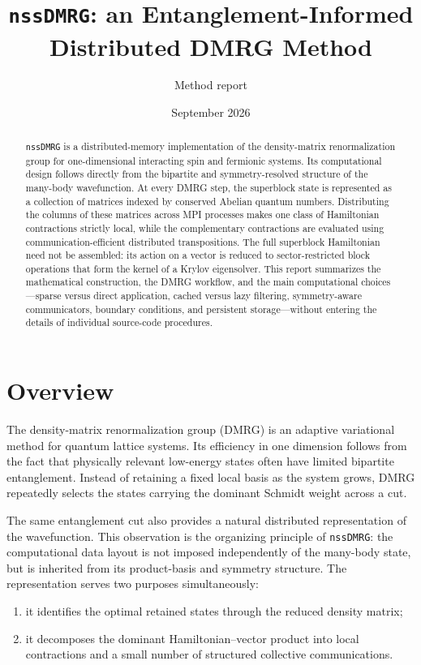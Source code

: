 \documentclass[11pt,a4paper]{article}
\title{\texttt{nssDMRG}: an Entanglement-Informed\\
Distributed DMRG Method}
\author{Method report}
\date{September 2026}
\begin{document}
\maketitle

\begin{abstract}
\texttt{nssDMRG} is a distributed-memory implementation of the density-matrix
renormalization group for one-dimensional interacting spin and fermionic
systems.  Its computational design follows directly from the bipartite and
symmetry-resolved structure of the many-body wavefunction.  At every DMRG
step, the superblock state is represented as a collection of matrices indexed
by conserved Abelian quantum numbers.  Distributing the columns of these
matrices across MPI processes makes one class of Hamiltonian contractions
strictly local, while the complementary contractions are evaluated using
communication-efficient distributed transpositions.  The full superblock
Hamiltonian need not be assembled: its action on a vector is reduced to
sector-restricted block operations that form the kernel of a Krylov
eigensolver.  This report summarizes the mathematical construction, the DMRG
workflow, and the main computational choices---sparse versus direct
application, cached versus lazy filtering, symmetry-aware communicators,
boundary conditions, and persistent storage---without entering the details
of individual source-code procedures.
\end{abstract}

\tableofcontents

\section{Overview}

The density-matrix renormalization group (DMRG) is an adaptive variational
method for quantum lattice systems.  Its efficiency in one dimension follows
from the fact that physically relevant low-energy states often have limited
bipartite entanglement.  Instead of retaining a fixed local basis as the
system grows, DMRG repeatedly selects the states carrying the dominant
Schmidt weight across a cut.

The same entanglement cut also provides a natural distributed representation
of the wavefunction.  This observation is the organizing principle of
\texttt{nssDMRG}: the computational data layout is not imposed independently
of the many-body state, but is inherited from its product-basis and symmetry
structure.  The representation serves two purposes simultaneously:
\begin{enumerate}[label=(\roman*)]
  \item it identifies the optimal retained states through the reduced density
        matrix;
  \item it decomposes the dominant Hamiltonian--vector product into local
        contractions and a small number of structured collective
        communications.
\end{enumerate}
\end{document}
